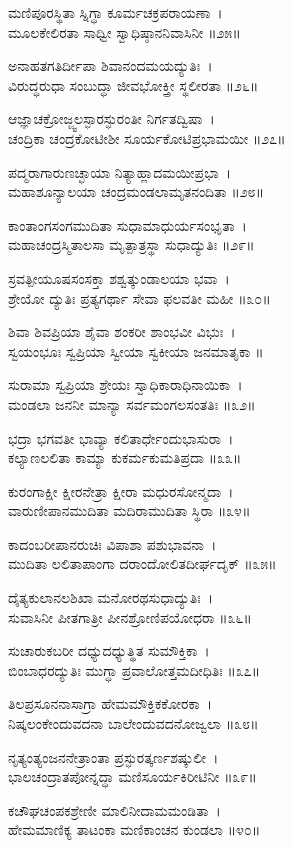 ಮಣಿಪೂರಸ್ಥಿತಾ ಸ್ನಿಗ್ಧಾ ಕೂರ್ಮಚಕ್ರಪರಾಯಣಾ~।\\
ಮೂಲಕೇಲಿರತಾ ಸಾಧ್ವೀ ಸ್ವಾಧಿಷ್ಠಾನನಿವಾಸಿನೀ ॥೨೫॥

	ಅನಾಹತಗತಿರ್ದೀಪಾ ಶಿವಾನಂದಮಯದ್ಯುತಿಃ~।\\
	ವಿರುದ್ಧರುಧಾ ಸಂಬುದ್ಧಾ ಜೀವಭೋಕ್ತ್ರೀ ಸ್ಥಲೀರತಾ ॥೨೬॥

ಆಜ್ಞಾಚಕ್ರೋಜ್ಜ್ವಲಸ್ಫಾರಸ್ಫುರಂತೀ ನಿರ್ಗತದ್ವಿಷಾ~।\\
ಚಂದ್ರಿಕಾ ಚಂದ್ರಕೋಟೀಶೀ ಸೂರ್ಯಕೋಟಿಪ್ರಭಾಮಯೀ ॥೨೭॥

	ಪದ್ಮರಾಗಾರುಣಚ್ಛಾಯಾ ನಿತ್ಯಾಹ್ಲಾದಮಯೀಪ್ರಭಾ~।\\
	ಮಹಾಶೂನ್ಯಾಲಯಾ ಚಂದ್ರಮಂಡಲಾಮೃತನಂದಿತಾ ॥೨೮॥

ಕಾಂತಾಂಗಸಂಗಮುದಿತಾ ಸುಧಾಮಾಧುರ್ಯಸಂಭೃತಾ~।\\
ಮಹಾಚಂದ್ರಸ್ಮಿತಾಲಸಾ ಮೃತ್ಪಾತ್ರಸ್ಥಾ ಸುಧಾದ್ಯುತಿಃ ॥೨೯॥

	ಸ್ರವತ್ಪೀಯೂಷಸಂಸಕ್ತಾ ಶಶ್ವತ್ಕುಂಡಾಲಯಾ ಭವಾ~।\\
	ಶ್ರೇಯೋ ದ್ಯುತಿಃ ಪ್ರತ್ಯಗರ್ಥಾ ಸೇವಾ ಫಲವತೀ ಮಹೀ ॥೩೦॥

ಶಿವಾ ಶಿವಪ್ರಿಯಾ ಶೈವಾ ಶಂಕರೀ ಶಾಂಭವೀ ವಿಭುಃ~।\\
ಸ್ವಯಂಭೂಃ ಸ್ವಪ್ರಿಯಾ ಸ್ವೀಯಾ ಸ್ವಕೀಯಾ ಜನಮಾತೃಕಾ ॥

	ಸುರಾಮಾ ಸ್ವಪ್ರಿಯಾ ಶ್ರೇಯಃ ಸ್ವಾಧಿಕಾರಾಧಿನಾಯಿಕಾ~।\\
	ಮಂಡಲಾ ಜನನೀ ಮಾನ್ಯಾ ಸರ್ವಮಂಗಲಸಂತತಿಃ ॥೩೨॥

ಭದ್ರಾ ಭಗವತೀ ಭಾವ್ಯಾ ಕಲಿತಾರ್ಧೇಂದುಭಾಸುರಾ~।\\
ಕಲ್ಯಾಣಲಲಿತಾ ಕಾಮ್ಯಾ ಕುಕರ್ಮಕುಮತಿಪ್ರದಾ ॥೩೩॥

	ಕುರಂಗಾಕ್ಷೀ ಕ್ಷೀರನೇತ್ರಾ ಕ್ಷೀರಾ ಮಧುರಸೋನ್ಮದಾ~।\\
	ವಾರುಣೀಪಾನಮುದಿತಾ ಮದಿರಾಮುದಿತಾ ಸ್ಥಿರಾ ॥೩೪॥

ಕಾದಂಬರೀಪಾನರುಚಿಃ ವಿಪಾಶಾ ಪಶುಭಾವನಾ~।\\
ಮುದಿತಾ ಲಲಿತಾಪಾಂಗಾ ದರಾಂದೋಲಿತದೀರ್ಘದೃಕ್ ॥೩೫॥

	ದೈತ್ಯಕುಲಾನಲಶಿಖಾ ಮನೋರಥಸುಧಾದ್ಯುತಿಃ~।\\
	ಸುವಾಸಿನೀ ಪೀತಗಾತ್ರೀ ಪೀನಶ್ರೋಣಿಪಯೋಧರಾ ॥೩೬॥

ಸುಚಾರುಕಬರೀ ದಧ್ಯುದಧ್ಯುತ್ಥಿತ ಸುಮೌಕ್ತಿಕಾ~।\\
ಬಿಂಬಾಧರದ್ಯುತಿಃ ಮುಗ್ಧಾ ಪ್ರವಾಲೋತ್ತಮದೀಧಿತಿಃ ॥೩೭॥

	ತಿಲಪ್ರಸೂನನಾಸಾಗ್ರಾ ಹೇಮಮೌಕ್ತಿಕಕೋರಕಾ~।\\
	ನಿಷ್ಕಲಂಕೇಂದುವದನಾ ಬಾಲೇಂದುವದನೋಜ್ವಲಾ ॥೩೮॥

ನೃತ್ಯಂತ್ಯಂಜನನೇತ್ರಾಂತಾ ಪ್ರಸ್ಫುರತ್ಕರ್ಣಶಷ್ಕುಲೀ~।\\
ಭಾಲಚಂದ್ರಾತಪೋನ್ನದ್ಧಾ ಮಣಿಸೂರ್ಯಕಿರೀಟಿನೀ ॥೩೯॥

	ಕಚೌಘಚಂಪಕಶ್ರೇಣೀ ಮಾಲಿನೀದಾಮಮಂಡಿತಾ~।\\
	ಹೇಮಮಾಣಿಕ್ಯ ತಾಟಂಕಾ ಮಣಿಕಾಂಚನ ಕುಂಡಲಾ ॥೪೦॥

